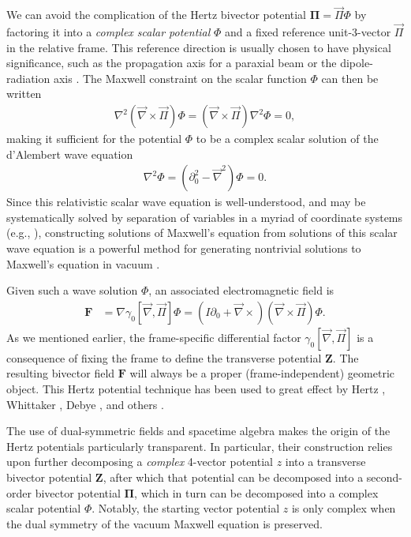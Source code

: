 \documentclass[1p,sort&compress]{elsarticle}
\numberwithin{equation}{section}
\newcommand{\rv}[1]{\vec{#1}}
\newcommand{\bv}[1]{\mathbf{#1}}
\begin{document}
We can avoid the complication of the Hertz bivector potential $\bv{\Pi} = \rv{\Pi}\Phi$ by factoring it into a \emph{complex scalar potential} $\Phi$ and a fixed reference unit-3-vector $\rv{\Pi}$ in the relative frame.  This reference direction is usually chosen to have physical significance, such as the propagation axis for a paraxial beam or the dipole-radiation axis  \cite{Bialynicki-Birula2013,Berry2011b}. The Maxwell constraint on the scalar function $\Phi$ can then be written
\begin{align}
  \nabla^2(\rv{\nabla}\times\rv{\Pi})\Phi = (\rv{\nabla}\times\rv{\Pi})\nabla^2\Phi = 0,
\end{align}
making it sufficient for the potential $\Phi$ to be a complex scalar solution of the d'Alembert wave equation
\begin{align}\label{eq:dalembert}
  \nabla^2\Phi = (\partial_0^2 - \rv{\nabla}^2) \Phi = 0.
\end{align}
Since this relativistic scalar wave equation is well-understood, and may be systematically solved by separation of variables in a myriad of coordinate systems (e.g., \cite{Kalnins1978}), constructing solutions of Maxwell's equation from solutions of this scalar wave equation is a powerful method for generating nontrivial solutions to Maxwell's equation in vacuum \cite{Bialynicki-Birula2013}.

Given such a wave solution $\Phi$, an associated electromagnetic field is 
\begin{align}
  \bv{F} &= \nabla\gamma_0[\rv{\nabla},\rv{\Pi}]\Phi = (I\partial_0 + \rv{\nabla}\times)(\rv{\nabla}\times\rv{\Pi})\Phi.
\end{align}
As we mentioned earlier, the frame-specific differential factor $\gamma_0[\rv{\nabla},\rv{\Pi}]$ is a consequence of fixing the frame to define the transverse potential $\bv{Z}$.  The resulting bivector field $\bv{F}$ will always be a proper (frame-independent) geometric object.  This Hertz potential technique has been used to great effect by Hertz \cite{Hertz1889}, Whittaker \cite{Whittaker1904}, Debye \cite{Debye1909}, and others \cite{Nisbet1955,Synge1965,Bialynicki-Birula2013}.  

The use of dual-symmetric fields and spacetime algebra makes the origin of the Hertz potentials particularly transparent.  In particular, their construction relies upon further decomposing a \emph{complex} 4-vector potential $z$ into a transverse bivector potential $\bv{Z}$, after which that potential can be decomposed into a second-order bivector potential $\bv{\Pi}$, which in turn can be decomposed into a complex scalar potential $\Phi$.  Notably, the starting vector potential $z$ is only complex when the dual symmetry of the vacuum Maxwell equation is preserved.
\end{document}
